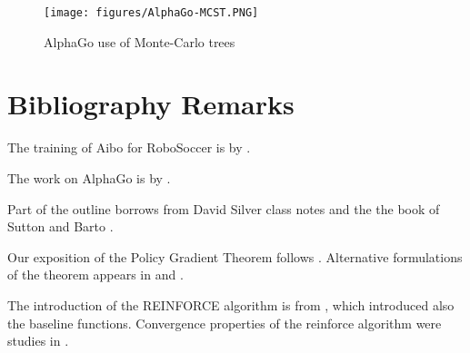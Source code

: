\begin{figure}
  \begin{centering}
  \texttt{[image: figures/AlphaGo-MCST.PNG]}\\
  \caption{AlphaGo use of Monte-Carlo trees}\label{fig:AlphaGo-MCST}
  \end{centering}
\end{figure}

\section{Bibliography Remarks}

The training of Aibo for RoboSoccer is by \cite{KohlS04}.

The work on AlphaGo is by \cite{SilverHMGSDSAPL16}.

Part of the outline borrows from David Silver class notes and the
the book of Sutton and Barto \cite{SuttonB98}.

Our exposition of the Policy Gradient Theorem follows \cite{SuttonMSM99}. Alternative formulations of the theorem appears in \cite{MarbachT01,MarbachT03} and \cite{BaxterB01}.

The introduction of the REINFORCE algorithm is from \cite{Williams92}, which introduced also the baseline functions. Convergence properties of the reinforce algorithm were studies in \cite{PhansalkarT95}.